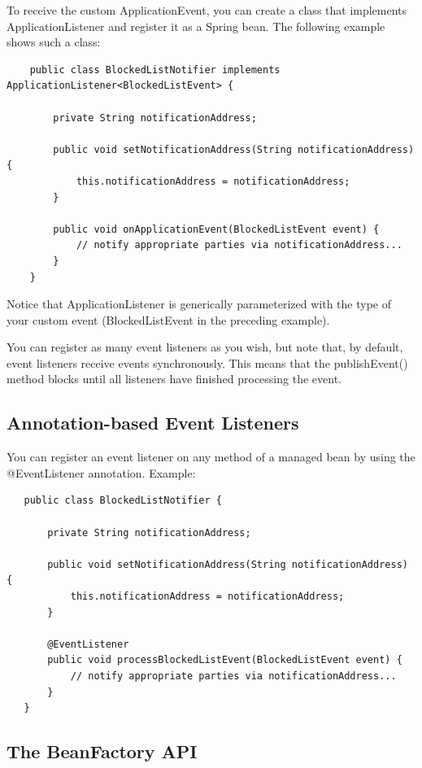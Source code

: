 \documentclass{scrartcl}
\begin{document}
To receive the custom ApplicationEvent, you can create a class that implements ApplicationListener and register it as a Spring bean. The following example shows such a class:

\begin{lstlisting}
    public class BlockedListNotifier implements ApplicationListener<BlockedListEvent> {

        private String notificationAddress;

        public void setNotificationAddress(String notificationAddress) {
            this.notificationAddress = notificationAddress;
        }

        public void onApplicationEvent(BlockedListEvent event) {
            // notify appropriate parties via notificationAddress...
        }
    }
\end{lstlisting}

Notice that ApplicationListener is generically parameterized with the type of your custom event (BlockedListEvent in the preceding example).

You can register as many event listeners as you wish, but note that, by default, event listeners receive events synchronously. This means that the publishEvent() method blocks until all listeners have finished processing the event.

\subsection{Annotation-based Event Listeners}

You can register an event listener on any method of a managed bean by using the @EventListener annotation. Example:

\begin{lstlisting}
   public class BlockedListNotifier {

       private String notificationAddress;

       public void setNotificationAddress(String notificationAddress) {
           this.notificationAddress = notificationAddress;
       }

       @EventListener
       public void processBlockedListEvent(BlockedListEvent event) {
           // notify appropriate parties via notificationAddress...
       }
   }
\end{lstlisting}

\subsection{The BeanFactory API}
\end{document}
